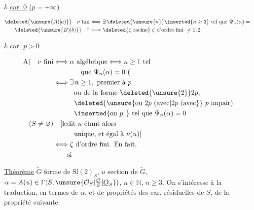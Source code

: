 



$k$ \uline{car. 0} \uline{($p=+\infty$)}

\[
\begin{aligned}
\deleted{\unsure{A)|a)}}\quad \nu\ \text{fini}&\Longleftrightarrow\exists\,\deleted{\unsure{n}}\inserted{n\geq3}\ \text{tel que }\Psi_n(\alpha)={}\\ 
\deleted{\unsure{B)|b)}}\quad\text{''}&\Longleftrightarrow \deleted{\zeta\ \text{racine}}\ \zeta\ \text{d'ordre fini }\ne1,2
\end{aligned}
\]

$k$ car. $p>0$

\[
\begin{aligned}
\mathrm A)\quad\nu\ \text{fini}&\Longleftrightarrow\alpha\ \text{algébrique}\Longleftrightarrow n\geq1\ \text{tel}\\ 
&\hspace{4em}\text{que }\Psi_n(\alpha)=0\ (\\ 
&\Longleftrightarrow\exists\,n\geq1,\ \text{premier à }p\\ 
&\hspace{3em}\text{ou de la forme }\deleted{\unsure{2}}2p,\\ 
&\hspace{3em}\deleted{\unsure{\text{ou }2p\ (\text{avec}|2p\ (\text{avec}}}\ p\ \text{impair})\\ 
&\hspace{3em}\inserted{\text{ou }p,}\ \text{tel que }\Psi_n(\alpha)=0\\ 
(S\ne\varnothing)&\quad[\text{ledit }n\ \text{étant alors}\\ 
&\hspace{3em}\text{unique, et égal à }\nu(u)]\\ 
&\Longleftrightarrow\zeta\ \text{d'ordre fini. En fait,}\\ 
&\hspace{2em}\text{si}
\end{aligned}
\]

\uline{Théorème} $\widetilde G$ forme de $\mathrm{Sl}(2)_S$, $u$ section de $\widetilde G$, $\alpha=A(u)\in\Gamma(S,\unsure{\mathcal O_S|\frac{\mathcal O}{S}|\underline{O}_S})$,
$n\in\mathbb N$, $\boxed{n\geq3}$. On s'intéresse à la traduction, en termes de $\alpha$,
et de propriétés des car. résiduelles de $S$, de la propriété
suivante


